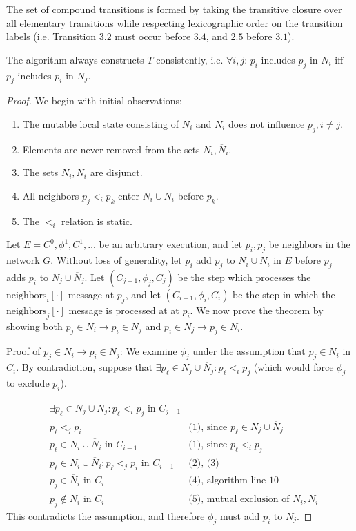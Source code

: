 The set of compound transitions is formed by taking the transitive closure over all elementary
transitions while respecting lexicographic order on the transition labels (i.e. Transition $3.2$
must occur before $3.4$, and $2.5$ before $3.1$).

\begin{theorem} \label{thm:tconsistent}
The algorithm always constructs $T$ consistently, i.e. $\forall i, j$:
$p_i$ includes $p_j$ in $N_i$ iff $p_j$ includes $p_i$ in $N_j$.
\end{theorem}

\begin{proof}
We begin with initial observations:

\begin{enumerate}
\item The mutable local state consisting of $N_i$ and
$\overline{N}_i$ does not influence $p_j, i \neq j$.
\item Elements are never removed from the sets $N_i, \overline{N}_i$.
\item The sets $N_i, \overline{N}_i$ are disjunct.
\item All neighbors $p_j <_i p_k$ enter $N_i \cup \overline{N}_i$ before $p_k$.
\item The $<_i$ relation is static.
\end{enumerate}

Let $E = C^0, \phi^1, C^1, \ldots$ be an arbitrary execution, and let $p_i, p_j$ be neighbors
in the network $G$. Without loss of generality, let $p_i$ add $p_j$ to $N_i \cup \overline{N}_i$
in $E$ before $p_j$ adds $p_i$ to $N_j \cup \overline{N}_j$. 
Let $(C_{j-1}, \phi_j, C_j)$ be the step which processes
the $\text{neighbors}_i[\cdot]$ message at $p_j$, and let $(C_{i-1}, \phi_i, C_i)$
be the step in which the $\text{neighbors}_j[\cdot]$ message is processed at at $p_i$.
We now prove the theorem by
showing both $p_j \in N_i \rightarrow p_i \in N_j$ and $p_i \in N_j \rightarrow p_j \in N_i$.

Proof of $p_j \in N_i \rightarrow p_i \in N_j$: 
We examine $\phi_j$ under the assumption that $p_j \in N_i$ in $C_i$.
By contradiction, suppose that $\exists p_\ell \in N_j \cup \overline{N}_j: 
p_\ell <_i p_j$ (which would force $\phi_j$ to exclude $p_i$). 

\begin{align}
&\exists p_\ell \in N_j \cup \overline{N}_j: p_\ell <_i p_j \text{ in } C_{j-1} & \\
&p_\ell <_j p_i & \text{(1), since } p_\ell \in N_j \cup \overline{N}_j \\
&p_\ell \in N_i \cup \overline{N}_i \text{ in } C_{i-1} & \text{(1), since } p_\ell <_i p_j \\
&p_\ell \in N_i \cup \overline{N}_i: p_\ell <_j p_i \text{ in } C_{i-1} & \text{(2), (3)} \\
&p_j \in \overline{N}_i \text{ in } C_i & \text{(4), algorithm line 10} \\
&p_j \not\in N_i \text{ in } C_i & \text{(5), mutual exclusion of } N_i, \overline{N}_i
\end{align}
This contradicts the assumption, and therefore $\phi_j$ must add $p_i$ to $N_j$.


\end{proof}
